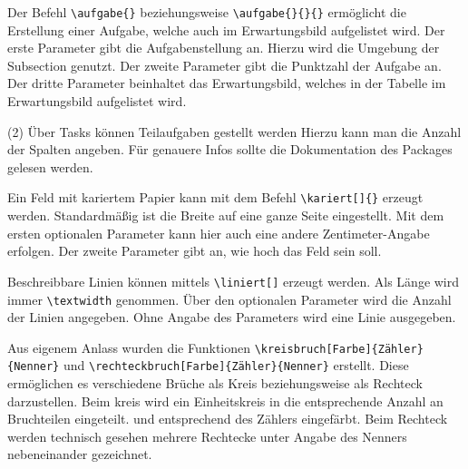 \documentclass[a4paper, 12pt]{article}
\begin{document}
\TITEL

Der Befehl \texttt{\textbackslash aufgabe\{\}} beziehungsweise \texttt{\textbackslash aufgabe\{\}\{\}\{\}} ermöglicht die Erstellung einer Aufgabe, welche auch im Erwartungsbild aufgelistet wird. Der erste Parameter gibt die Aufgabenstellung an. Hierzu wird die Umgebung der Subsection genutzt. Der zweite Parameter gibt die Punktzahl der Aufgabe an. Der dritte Parameter beinhaltet das Erwartungsbild, welches in der Tabelle im Erwartungsbild aufgelistet wird.

\begin{tasks}(2)
	\task Über Tasks können Teilaufgaben gestellt werden
	\task Hierzu kann man die Anzahl der Spalten angeben. Für genauere Infos sollte die Dokumentation des Packages gelesen werden.	
\end{tasks}

Ein Feld mit kariertem Papier kann mit dem Befehl \texttt{\textbackslash kariert[]\{\}} erzeugt werden. Standardmäßig ist die Breite auf eine ganze Seite eingestellt. Mit dem ersten optionalen Parameter kann hier auch eine andere Zentimeter-Angabe erfolgen. Der zweite Parameter gibt an, wie hoch das Feld sein soll.



Beschreibbare Linien können mittels \texttt{\textbackslash liniert[]} erzeugt werden. Als Länge wird immer \texttt{\textbackslash textwidth} genommen. Über den optionalen Parameter wird die Anzahl der Linien angegeben. Ohne Angabe des Parameters wird eine Linie ausgegeben.

\liniert[3]


Aus eigenem Anlass wurden die Funktionen \texttt{\textbackslash kreisbruch[Farbe]\{Zähler\}\{Nenner\}} und \texttt{\textbackslash rechteckbruch[Farbe]\{Zähler\}\{Nenner\}} erstellt. Diese ermöglichen es verschiedene Brüche als Kreis beziehungsweise als Rechteck darzustellen. Beim kreis wird ein Einheitskreis in die entsprechende Anzahl an Bruchteilen eingeteilt. und entsprechend des Zählers eingefärbt. Beim Rechteck werden technisch gesehen mehrere Rechtecke unter Angabe des Nenners nebeneinander gezeichnet.
\end{document}
